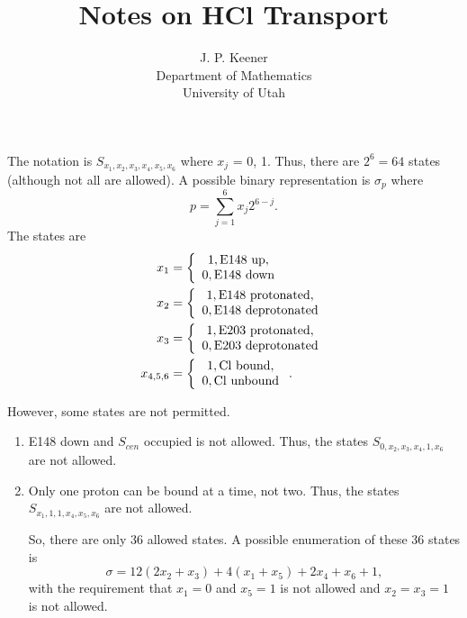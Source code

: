 \documentclass[12pt]{article}
\title{Notes on HCl Transport}
\author{J. P.  Keener\\Department of Mathematics\\University of Utah}
\def\beq{\begin{equation}}
\def\eeq{\end{equation}}
\def\bea{\begin{eqnarray}}
\def\ena{\end{eqnarray}}
\begin{document}
\maketitle


The notation is $S_{x_1,x_2,x_3,x_4,x_5,x_6}$ where $x_j$ = 0, 1.  Thus, there are $2^6 =64$ states (although not all are allowed).  A possible  binary representation is $\sigma_p$ where 
\beq
p = \sum_{j=1}^6 x_j 2^{6-j}.
\eeq
The states are
\bea
x_1&=\left\{ \begin{array}{cc} 1,  {\rm E148~up},\\0, {\rm E148~down} \end{array}\right.\\
x_2&= \left\{ \begin{array}{cc} 1,  {\rm E148~protonated },\\0, {\rm E148~deprotonated} \end{array}\right.\\
x_3&=\left\{ \begin{array}{cc} 1,  {\rm E203~protonated },\\0, {\rm E203~deprotonated} \end{array}\right.\\
x_{4,5,6} &=\left\{ \begin{array}{cc} 1,  {\rm Cl~bound},\\0, {\rm Cl~unbound} \end{array}\right..
\ena

However, some states are not permitted.
\begin{enumerate}
\item E148 down and $S_{cen}$ occupied is not allowed.   Thus, the states $S_{0,x_2,x_3,x_4,1,x_6}$  are not allowed.  \item Only one proton can be bound at a time, not two.  Thus, the states $S_{x_1,1,1,x_4,x_5,x_6}$ are not allowed.

So, there are only 36 allowed states.
A possible enumeration of these 36 states is 
\beq
\sigma  = 12(2x_2+x_3)+4(x_1+x_5)+2x_4+x_6+1,
\eeq
with the requirement that $x_1=0$ and $x_5=1$ is not allowed and $x_2=x_3=1$ is not allowed.
 \end{enumerate}

 
\end{document}
